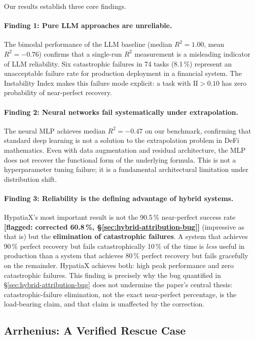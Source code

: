 \documentclass[twoside,11pt]{article}
\newcommand{\Rsq}{R^{2}}
\newcommand{\II}{\mathrm{II}}
\begin{document}
Our results establish three core findings.

\paragraph{Finding 1: Pure LLM approaches are unreliable.}
The bimodal performance of the LLM baseline (median $\Rsq=1.00$, mean $\Rsq=-0.76$)
confirms that a single-run $\Rsq$ measurement is a misleading indicator of LLM
reliability.  Six catastrophic failures in 74 tasks (8.1\,\%) represent an
unacceptable failure rate for production deployment in a financial system.  The
Instability Index makes this failure mode explicit: a task with $\II>0.10$ has
zero probability of near-perfect recovery.

\paragraph{Finding 2: Neural networks fail systematically under extrapolation.}
The neural MLP achieves median $\Rsq=-0.47$ on our benchmark, confirming that
standard deep learning is not a solution to the extrapolation problem in DeFi
mathematics.  Even with data augmentation and residual architecture, the MLP does
not recover the functional form of the underlying formula.  This is not a
hyperparameter tuning failure; it is a fundamental architectural limitation under
distribution shift.

\paragraph{Finding 3: Reliability is the defining advantage of hybrid systems.}
HypatiaX's most important result is not the 90.5\,\% near-perfect success rate
\textbf{[flagged: corrected 60.8\,\%, \S\ref{sec:hybrid-attribution-bug}]}
(impressive as that is) but the \textbf{elimination of catastrophic failures}.
A system that achieves 90\,\% perfect recovery but fails catastrophically 10\,\%
of the time is \emph{less} useful in production than a system that achieves 80\,\%
perfect recovery but fails gracefully on the remainder.  HypatiaX achieves both:
high peak performance and zero catastrophic failures. This finding is precisely
why the bug quantified in \S\ref{sec:hybrid-attribution-bug} does not undermine
the paper's central thesis: catastrophic-failure elimination, not the exact
near-perfect percentage, is the load-bearing claim, and that claim is
unaffected by the correction.

\subsection{Arrhenius: A Verified Rescue Case}\label{subsec:arrhenius-and-scaleincompatibility-failu}
\label{sec:arrhenius_failure}
\end{document}
